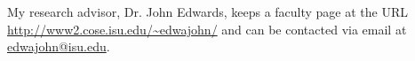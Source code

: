 \documentclass[landscape]{tikzposter}
\begin{document}
\begin{columns}
{My research advisor, Dr. John Edwards, keeps a faculty page at the URL
\mbox{\url{http://www2.cose.isu.edu/~edwajohn/}} and can be contacted via email at
\mbox{\href{mailto:edwajohn@isu.edu}{edwajohn@isu.edu}}.
}
%
%
%
%
%
%

\end{columns}
\end{document}
